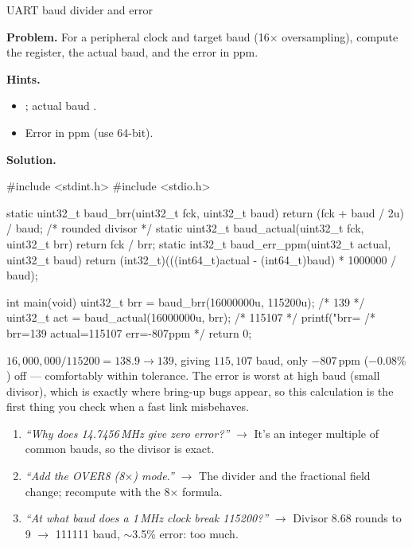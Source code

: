 \begin{gymproblem}{UART baud divider and error}

\textbf{Problem.} For a peripheral clock and target baud (16$\times$
oversampling), compute the  register, the actual baud, and the error
in ppm.

\textbf{Hints.}
\begin{itemize}
\item {}; actual baud .
\item Error in ppm  (use 64-bit).
\end{itemize}

\attempt

\textbf{Solution.}
\begin{cgym}
#include <stdint.h>
#include <stdio.h>

static uint32_t baud_brr(uint32_t fck, uint32_t baud) {
    return (fck + baud / 2u) / baud;          /* rounded divisor */
}
static uint32_t baud_actual(uint32_t fck, uint32_t brr) {
    return fck / brr;
}
static int32_t baud_err_ppm(uint32_t actual, uint32_t baud) {
    return (int32_t)(((int64_t)actual - (int64_t)baud) * 1000000 / baud);
}

int main(void) {
    uint32_t brr = baud_brr(16000000u, 115200u);     /* 139 */
    uint32_t act = baud_actual(16000000u, brr);       /* 115107 */
    printf("brr=%
    /* brr=139 actual=115107 err=-807ppm */
    return 0;
}
\end{cgym}

$16{,}000{,}000/115200 = 138.9 \rightarrow 139$, giving $115{,}107$ baud, only
$-807$\,ppm ($-0.08\%$) off --- comfortably within tolerance. The error is worst
at high baud (small divisor), which is exactly where bring-up bugs appear, so
this calculation is the first thing you check when a fast link misbehaves.

\followups
\begin{enumerate}
\item \emph{``Why does 14.7456\,MHz give zero error?''} $\rightarrow$ It's an
  integer multiple of common bauds, so the divisor is exact.
\item \emph{``Add the OVER8 (8$\times$) mode.''} $\rightarrow$ The divider and
  the fractional field change; recompute with the 8$\times$ formula.
\item \emph{``At what baud does a 1\,MHz clock break 115200?''} $\rightarrow$
  Divisor 8.68 rounds to 9 $\rightarrow$ 111111 baud, $\sim$3.5\% error: too
  much.
\end{enumerate}
\end{gymproblem}

